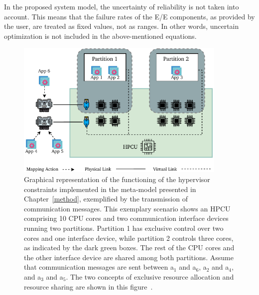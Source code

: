     In the proposed system model, the uncertainty of reliability is not taken into account. This means that the failure rates of the E/E components, as provided by the user, are treated as fixed values, not as ranges. In other words, uncertain optimization is not included in the above-mentioned equations.
    
    
    
    
        \begin{figure}[ht]
    	\centering
    	\includegraphics[width=0.9\textwidth]{figures/hypervisor_req.pdf}
    	\caption{ Graphical representation of the functioning of the hypervisor constraints implemented in the meta-model presented in Chapter~\ref{method}, exemplified by the transmission of communication messages. This exemplary scenario shows an HPCU comprising 10 CPU cores and two communication interface devices running two partitions. Partition 1 has exclusive control over two cores and one interface device, while partition 2 controls three cores, as indicated by the dark green boxes. The rest of the CPU cores and the other interface device are shared among both partitions. Assume that communication messages are sent between a$_1$ and a$_6$, a$_2$ and a$_4$, and a$_3$ and a$_5$. The two concepts of exclusive resource allocation and resource sharing are shown in this figure~\cite{10588416}.}
    	\label{fig_hyp}
        \end{figure}
